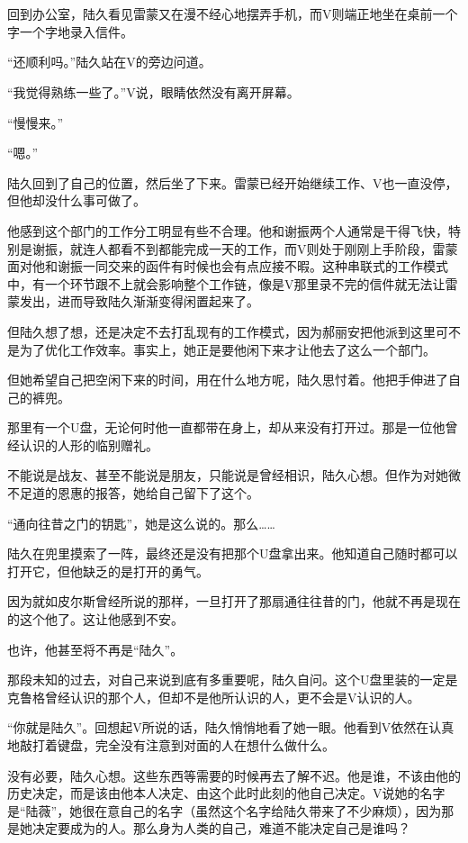 \section*{}

回到办公室，陆久看见雷蒙又在漫不经心地摆弄手机，而V则端正地坐在桌前一个字一个字地录入信件。

“还顺利吗。”陆久站在V的旁边问道。

“我觉得熟练一些了。”V说，眼睛依然没有离开屏幕。

“慢慢来。”

“嗯。”

陆久回到了自己的位置，然后坐了下来。雷蒙已经开始继续工作、V也一直没停，但他却没什么事可做了。

他感到这个部门的工作分工明显有些不合理。他和谢振两个人通常是干得飞快，特别是谢振，就连人都看不到都能完成一天的工作，而V则处于刚刚上手阶段，雷蒙面对他和谢振一同交来的函件有时候也会有点应接不暇。这种串联式的工作模式中，有一个环节跟不上就会影响整个工作链，像是V那里录不完的信件就无法让雷蒙发出，进而导致陆久渐渐变得闲置起来了。

但陆久想了想，还是决定不去打乱现有的工作模式，因为郝丽安把他派到这里可不是为了优化工作效率。事实上，她正是要他闲下来才让他去了这么一个部门。

但她希望自己把空闲下来的时间，用在什么地方呢，陆久思忖着。他把手伸进了自己的裤兜。

那里有一个U盘，无论何时他一直都带在身上，却从来没有打开过。那是一位他曾经认识的人形的临别赠礼。

不能说是战友、甚至不能说是朋友，只能说是曾经相识，陆久心想。但作为对她微不足道的恩惠的报答，她给自己留下了这个。

“通向往昔之门的钥匙”，她是这么说的。那么……

陆久在兜里摸索了一阵，最终还是没有把那个U盘拿出来。他知道自己随时都可以打开它，但他缺乏的是打开的勇气。

因为就如皮尔斯曾经所说的那样，一旦打开了那扇通往往昔的门，他就不再是现在的这个他了。这让他感到不安。

也许，他甚至将不再是“陆久”。

那段未知的过去，对自己来说到底有多重要呢，陆久自问。这个U盘里装的一定是克鲁格曾经认识的那个人，但却不是他所认识的人，更不会是V认识的人。

“你就是陆久”。回想起V所说的话，陆久悄悄地看了她一眼。他看到V依然在认真地敲打着键盘，完全没有注意到对面的人在想什么做什么。

没有必要，陆久心想。这些东西等需要的时候再去了解不迟。他是谁，不该由他的历史决定，而是该由他本人决定、由这个此时此刻的他自己决定。V说她的名字是“陆薇”，她很在意自己的名字（虽然这个名字给陆久带来了不少麻烦），因为那是她决定要成为的人。那么身为人类的自己，难道不能决定自己是谁吗？

